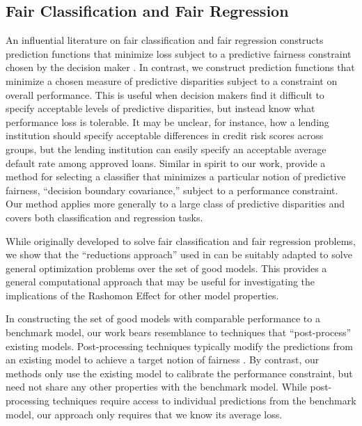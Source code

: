\documentclass{article}
\begin{document}
\subsection{Fair Classification and Fair Regression}

An influential literature on fair classification and fair regression constructs prediction functions that minimize loss subject to a predictive fairness constraint chosen by the decision maker \cite{Dwork2012, ZemelEtAl(13), hardt2016equality, MenonWilliamson(18), DoniniEtAl(18), agarwal2018reductions, AgarwalEtAl(19)-FairRegression, ZafarEtAl(19)}. In contrast, we construct prediction functions that minimize a chosen measure of predictive disparities subject to a constraint on overall performance. This is useful when decision makers find it difficult to specify acceptable levels of predictive disparities, but instead know what performance loss is tolerable. It may be unclear, for instance, how a lending institution should specify acceptable differences in credit risk scores across groups, but the lending institution can easily specify an acceptable average default rate among approved loans. Similar in spirit to our work, \cite{ZafarEtAl(19)} provide a method for selecting a classifier that minimizes a particular notion of predictive fairness, ``decision boundary covariance,'' subject to a performance constraint. Our method applies more generally to a large class of predictive disparities and covers both classification and regression tasks.

While originally developed to solve fair classification and fair regression problems, we show that the ``reductions approach'' used in \cite{agarwal2018reductions, AgarwalEtAl(19)-FairRegression} can be suitably adapted to solve general optimization problems over the set of good models. This provides a general computational approach that may be useful for investigating the implications of the Rashomon Effect for other model properties. 

In constructing the set of good models with comparable performance to a benchmark model, our work bears resemblance to techniques that ``post-process'' existing models.
Post-processing techniques typically modify the predictions from an existing model to achieve a target notion of fairness \cite{hardt2016equality, PleissEtAl(17), KimEtAl(19)}. By contrast, our methods only use the existing model to calibrate the performance constraint, but need not share any other properties with the benchmark model. While post-processing techniques require access to individual predictions from the benchmark model, our approach only requires that we know its average loss.
\end{document}
